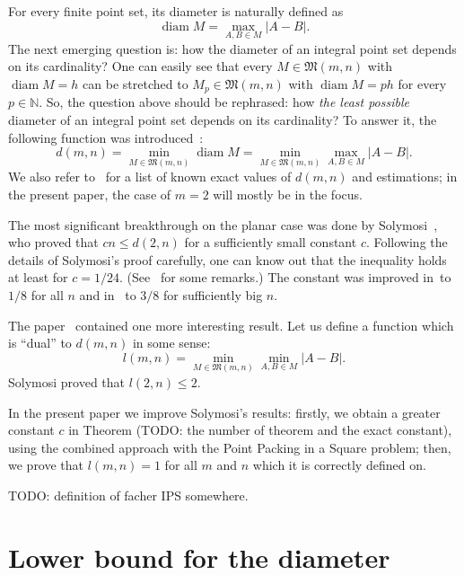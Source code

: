 \documentclass[a4paper,14pt]{article} %
\theoremstyle{plain}
\begin{document}
For every finite point set, its diameter is naturally defined as
\begin{equation}
	\operatorname{diam} M = \max_{A,B\in M} |A-B|
	.
\end{equation}
The next emerging question is: how the diameter of an integral point set depends on its cardinality?
One can easily see that every $M\in\mathfrak{M}(m,n)$ with $\operatorname{diam} M = h$
can be stretched to $M_p\in\mathfrak{M}(m,n)$ with $\operatorname{diam} M = ph$
for every $p\in\mathbb{N}$.
So, the question above should be rephrased:
how \textit{the least possible} diameter of an integral point set depends on its cardinality?
To answer it, the following function was introduced~\cite{kurz2008bounds,kurz2008minimum}:
\begin{equation}
	d(m,n) = \min_{M\in\mathfrak{M}(m,n)} \operatorname{diam} M = \min_{M\in\mathfrak{M}(m,n)} \max_{A,B\in M} |A-B|
	.
\end{equation}
We also refer to~\cite{kurz2008bounds} for a list of known exact values of $d(m,n)$
and estimations; in the present paper, the case of $m=2$ will mostly be in the focus.

The most significant breakthrough on the planar case was done by Solymosi~\cite{solymosi2003note},
who proved that $cn \leq d(2,n)$ for a sufficiently small constant $c$.
Following the details of Solymosi's proof carefully,
one can know out that the inequality holds at least for $c = 1/24$.
(See~\cite[Exercise 2.6]{garibaldi2005erdos} for some remarks.)
The constant was improved in~\cite{our-mz-rus}to $1/8$ for all $n$ and in~\cite{our-vmmsh-2018}
to $3/8$ for sufficiently big $n$.

The paper~\cite{solymosi2003note} contained one more interesting result.
Let us define a function which is ``dual'' to $d(m,n)$ in some sense:
\begin{equation}
	l(m,n) = \min_{M\in\mathfrak{M}(m,n)} \min_{A,B\in M} |A-B|
	.
\end{equation}
Solymosi proved that $l(2,n)\leq 2$.

In the present paper we improve Solymosi's results:
firstly, we obtain a greater constant $c$ in Theorem (TODO: the number of theorem and the exact constant),
using the combined approach with the Point Packing in a Square problem;
then, we prove that $l(m,n)=1$ for all $m$ and $n$ which it is correctly defined on.


TODO: definition of facher IPS somewhere.

\section{Lower bound for the diameter}
\end{document}
